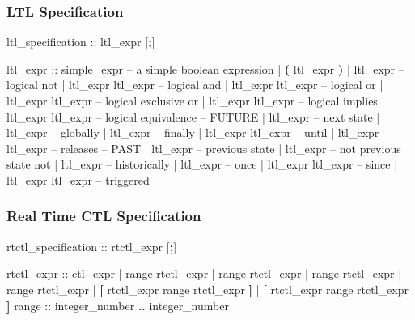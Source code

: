 \subsubsection{LTL Specification}
\begin{Grammar}
ltl_specification ::  ltl_expr [\textbf{;}]
\end{Grammar}

\begin{Grammar}
ltl_expr ::
    simple_expr              -- a simple boolean expression
    | \textbf{(} ltl_expr \textbf{)}
    | \operator{!} ltl_expr             -- logical not
    | ltl_expr \operator{\&} ltl_expr    -- logical and
    | ltl_expr \operator{|} ltl_expr    -- logical or
    | ltl_expr  ltl_expr  -- logical exclusive or
    | ltl_expr \operator{->} ltl_expr   -- logical implies
    | ltl_expr \operator{<->} ltl_expr  -- logical equivalence
    -- FUTURE
    |  ltl_expr             -- next state
    |  ltl_expr             -- globally
    |  ltl_expr             -- finally
    | ltl_expr  ltl_expr    -- until
    | ltl_expr  ltl_expr    -- releases
    -- PAST
    |  ltl_expr             -- previous state
    |  ltl_expr             -- not previous state not
    |  ltl_expr             -- historically
    |  ltl_expr             -- once 
    | ltl_expr  ltl_expr    -- since
    | ltl_expr  ltl_expr    -- triggered
\end{Grammar}


\subsubsection{Real Time CTL Specification}
\begin{Grammar}
rtctl_specification ::  rtctl_expr [\textbf{;}]
\end{Grammar}

\begin{Grammar}
rtctl_expr ::
        ctl_expr
      |  range rtctl_expr
      |  range rtctl_expr
      |  range rtctl_expr
      |  range rtctl_expr
      |  \textbf{[} rtctl_expr  range rtctl_expr \textbf{]}
      |  \textbf{[} rtctl_expr  range rtctl_expr \textbf{]}
range  :: integer_number \textbf{..} integer_number
\end{Grammar}

